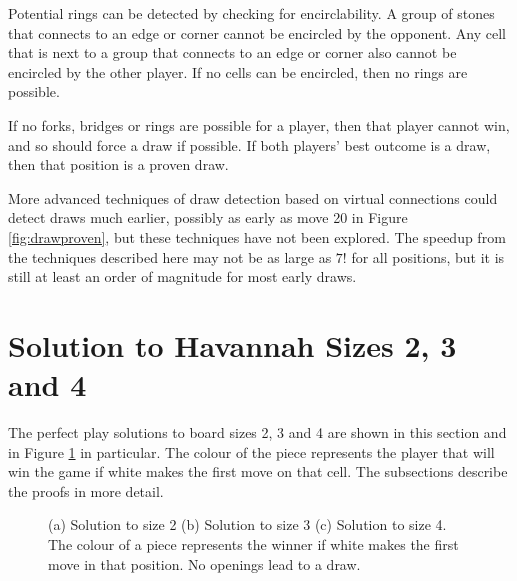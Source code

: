 Potential rings can be detected by checking for encirclability. A group of stones that connects to an edge or corner cannot be encircled by the opponent. Any cell that is next to a group that connects to an edge or corner also cannot be encircled by the other player. If no cells can be encircled, then no rings are possible.

If no forks, bridges or rings are possible for a player, then that player cannot win, and so should force a draw if possible. If both players' best outcome is a draw, then that position is a proven draw.

More advanced techniques of draw detection based on virtual connections could detect draws much earlier, possibly as early as move 20 in Figure \ref{fig:drawproven}, but these techniques have not been explored. The speedup from the techniques described here may not be as large as $7!$ for all positions, but it is still at least an order of magnitude for most early draws.


\section{Solution to Havannah Sizes 2, 3 and 4}

The perfect play solutions to board sizes 2, 3 and 4 are shown in this section and in Figure \ref{fig:solutionboard} in particular. The colour of the piece represents the player that will win the game if white makes the first move on that cell. The subsections describe the proofs in more detail.

\begin{figure}[tb]
\centering
\caption[Solution to Board Sizes 2, 3 and 4]{(a) Solution to size 2 (b) Solution to size 3 (c) Solution to size 4. The colour of a piece represents the winner if white makes the first move in that position. No openings lead to a draw.}
\label{fig:solutionboard}
\end{figure}



